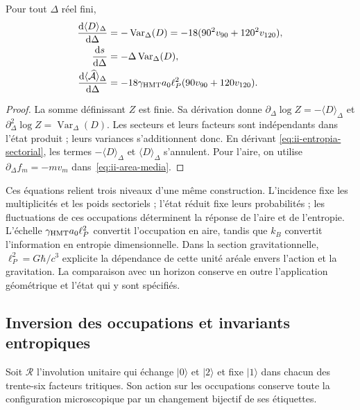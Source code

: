 \begin{proposition}
Pour tout $\Delta$ réel fini,
\begin{align}
 \frac{\mathrm d\langle D\rangle_\Delta}{\mathrm d\Delta}
 &=-\operatorname{Var}_\Delta(D)
   =-18(90^2v_{90}+120^2v_{120}),\\
 \frac{\mathrm d s}{\mathrm d\Delta}
 &=-\Delta\operatorname{Var}_\Delta(D),
 \label{eq:ii-respuesta-entropica}\\
 \frac{\mathrm d\langle\widehat{\mathcal A}\rangle_\Delta}{\mathrm d\Delta}
 &=-18\gamma_{\mathrm{HMT}}a_0\ell_P^2(90v_{90}+120v_{120}).
 \label{eq:ii-respuesta-areal}
\end{align}
\end{proposition}
\begin{proof}
La somme définissant $Z$ est finie. Sa dérivation donne
$\partial_\Delta\log Z=-\langle D\rangle_\Delta$ et
$\partial_\Delta^2\log Z=\operatorname{Var}_\Delta(D)$.
Les secteurs et leurs facteurs sont indépendants dans l'état produit ;
leurs variances s'additionnent donc. En dérivant
\eqref{eq:ii-entropia-sectorial}, les termes
$-\langle D\rangle_\Delta$ et $\langle D\rangle_\Delta$
s'annulent. Pour l'aire, on utilise
$\partial_\Delta f_m=-mv_m$ dans~\eqref{eq:ii-area-media}.
\end{proof}

Ces équations relient trois niveaux d'une même construction.
L'incidence fixe les multiplicités et les poids sectoriels ;
l'état réduit fixe leurs probabilités ; les fluctuations de ces
occupations déterminent la réponse de l'aire et de l'entropie.
L'échelle $\gamma_{\mathrm{HMT}}a_0\ell_P^2$ convertit l'occupation en aire,
tandis que $k_B$ convertit l'information en entropie dimensionnelle.
Dans la section gravitationnelle, $\ell_P^2=G\hbar/c^3$ explicite
la dépendance de cette unité aréale envers l'action et la gravitation.
La comparaison avec un horizon conserve en outre l'application
géométrique et l'état qui y sont spécifiés.

\subsection{Inversion des occupations et invariants entropiques}
\label{sec:ii-inversion-sectorial}

Soit $\mathcal R$ l'involution unitaire qui échange $|0\rangle$
et $|2\rangle$ et fixe $|1\rangle$ dans chacun des trente-six
facteurs tritiques. Son action sur les occupations conserve toute la
configuration microscopique par un changement bijectif de ses étiquettes.

